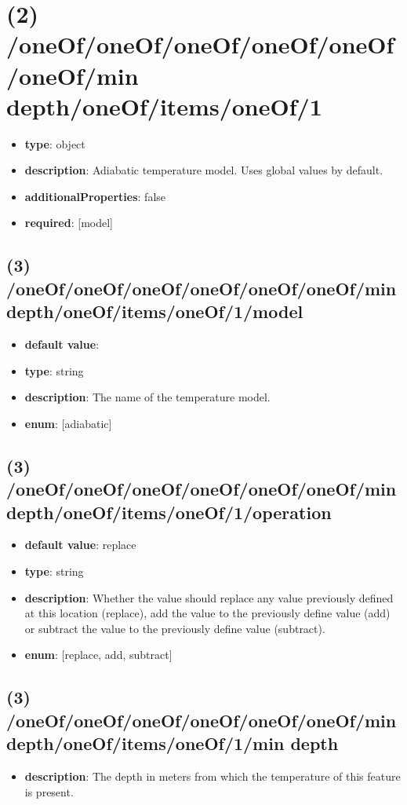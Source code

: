 \section{(2) /oneOf/oneOf/oneOf/oneOf/oneOf/oneOf/min depth/oneOf/items/oneOf/1}
\begin{itemize}[leftmargin=2em]\item {\bf type}: object
\item {\bf description}: Adiabatic temperature model. Uses global values by default.
\item {\bf additionalProperties}: false
\item {\bf required}: [model]\end{itemize}
\subsection{(3) /oneOf/oneOf/oneOf/oneOf/oneOf/oneOf/min depth/oneOf/items/oneOf/1/model}
\begin{itemize}[leftmargin=3em]\item {\bf default value}: 
\item {\bf type}: string
\item {\bf description}: The name of the temperature model.
\item {\bf enum}: [adiabatic]\end{itemize}\subsection{(3) /oneOf/oneOf/oneOf/oneOf/oneOf/oneOf/min depth/oneOf/items/oneOf/1/operation}
\begin{itemize}[leftmargin=3em]\item {\bf default value}: replace
\item {\bf type}: string
\item {\bf description}: Whether the value should replace any value previously defined at this location (replace), add the value to the previously define value (add) or subtract the value to the previously define value (subtract).
\item {\bf enum}: [replace, add, subtract]\end{itemize}\subsection{(3) /oneOf/oneOf/oneOf/oneOf/oneOf/oneOf/min depth/oneOf/items/oneOf/1/min depth}
\begin{itemize}[leftmargin=3em]\item {\bf description}: The depth in meters from which the temperature of this feature is present.
\end{itemize}
